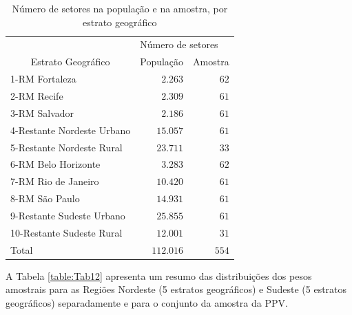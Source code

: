 \documentclass[]{book}
\numberwithin{example}{chapter}
\numberwithin{remark}{chapter}
\numberwithin{definition}{chapter}
\begin{document}
\begin{center}
\begin{table}[!htbp] \centering

\caption{Número de setores na população e na amostra, por estrato geográfico}
\bigskip \label{table:Tab11}
\begin{tabular}{|l|c|c|}
\hline\hline
& \multicolumn{2}{|l|}{Número de setores} \\ \cline{2-3}
\multicolumn{1}{|c|}{Estrato Geográfico} & População & Amostra
\\ \hline\hline
1-RM Fortaleza & \multicolumn{1}{|r|}{$2.263$} & \multicolumn{1}{|r|}{$62$}
\\ \hline
2-RM Recife & \multicolumn{1}{|r|}{$2.309$} & \multicolumn{1}{|r|}{$61$} \\
\hline
3-RM Salvador & \multicolumn{1}{|r|}{$2.186$} & \multicolumn{1}{|r|}{$61$}
\\ \hline
4-Restante Nordeste Urbano & \multicolumn{1}{|r|}{$15.057$} &
\multicolumn{1}{|r|}{$61$} \\ \hline
5-Restante Nordeste Rural & \multicolumn{1}{|r|}{$23.711$} &
\multicolumn{1}{|r|}{$33$} \\ \hline
6-RM Belo Horizonte & \multicolumn{1}{|r|}{$3.283$} & \multicolumn{1}{|r|}{$%
62$} \\ \hline
7-RM Rio de Janeiro & \multicolumn{1}{|r|}{$10.420$} & \multicolumn{1}{|r|}{$%
61$} \\ \hline
8-RM São Paulo & \multicolumn{1}{|r|}{$14.931$} & \multicolumn{1}{|r|}{$%
61$} \\ \hline
9-Restante Sudeste Urbano & \multicolumn{1}{|r|}{$25.855$} &
\multicolumn{1}{|r|}{$61$} \\ \hline
10-Restante Sudeste Rural & \multicolumn{1}{|r|}{$12.001$} &
\multicolumn{1}{|r|}{$31$} \\ \hline\hline
Total & \multicolumn{1}{|r|}{$112.016$} & \multicolumn{1}{|r|}{$554$} \\
\hline\hline
\end{tabular}
\end{table}
\end{center}

A Tabela \ref{table:Tab12} apresenta um resumo das distribuições dos
pesos amostrais para as Regiões Nordeste (5 estratos geográficos) e
Sudeste (5 estratos geográficos) separadamente e para o conjunto da
amostra da PPV.
\end{document}
